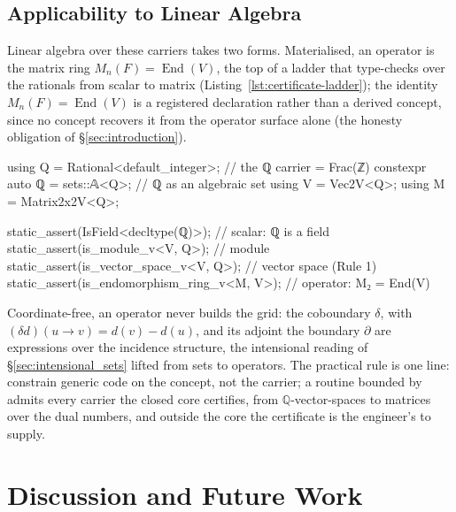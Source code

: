 \documentclass[11pt, a4paper]{article}
\begin{document}
\subsection{Applicability to Linear Algebra}
\label{sec:certificate_ladder}
\label{sec:operational_calculus}
\label{sec:geometric_mappings}

Linear algebra over these carriers takes two forms.
Materialised, an operator is the matrix ring $M_n(F) = \operatorname{End}(V)$, the top of a ladder that type-checks over the rationals from scalar to matrix (Listing~\ref{lst:certificate-ladder}); the identity $M_n(F) = \operatorname{End}(V)$ is a registered declaration rather than a derived concept, since no concept recovers it from the operator surface alone (the honesty obligation of §\ref{sec:introduction}).

\begin{listing}[!ht]
\caption{The certificate ladder over $\mathbb{Q}$: four rungs, each a  the compiler discharges.}
\label{lst:certificate-ladder}
\begin{cpp}
using Q = Rational<default_integer>;         // the ℚ carrier = Frac(ℤ)
constexpr auto ℚ = sets::𝔸<Q>{};             // ℚ as an algebraic set
using V = Vec2V<Q>;  using M = Matrix2x2V<Q>;

static_assert(IsField<decltype(ℚ)>);         // scalar: ℚ is a field
static_assert(is_module_v<V, Q>);            // module
static_assert(is_vector_space_v<V, Q>);      // vector space  (Rule 1)
static_assert(is_endomorphism_ring_v<M, V>); // operator: M₂ = End(V)
\end{cpp}
\end{listing}

Coordinate-free, an operator never builds the grid: the coboundary $\delta$, with $(\delta d)(u \to v) = d(v) - d(u)$, and its adjoint the boundary $\partial$ are expressions over the incidence structure, the intensional reading of §\ref{sec:intensional_sets} lifted from sets to operators.
The practical rule is one line: constrain generic code on the concept, not the carrier; a routine bounded by  admits every carrier the closed core certifies, from $\mathbb{Q}$-vector-spaces to matrices over the dual numbers, and outside the core the certificate is the engineer's to supply.

\section{Discussion and Future Work}
\label{sec:discussion}
\end{document}
